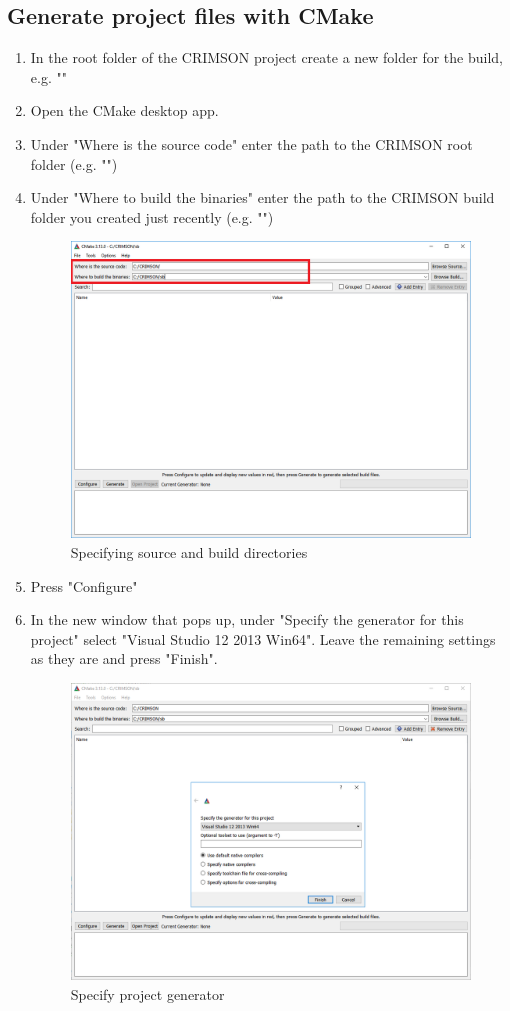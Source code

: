 \documentclass[]{scrartcl}
\begin{document}
\subsection{Generate project files with CMake}
\begin{enumerate}
	\item In the root folder of the CRIMSON project create a new folder for the build, e.g. ""
	\item Open the CMake desktop app.
	\item Under "Where is the source code" enter the path to the CRIMSON root folder (e.g. "")
	\item Under "Where to build the binaries" enter the path to the CRIMSON build folder you created just recently (e.g. "")
	
	\begin{figure}[H]
		\centering
		\includegraphics[width=0.8\linewidth]{Images/folders}
		\caption{Specifying source and build directories}
		\label{fig:folders}
	\end{figure}

	\item Press "Configure"
	\item In the new window that pops up, under "Specify the generator for this project" select "Visual Studio 12 2013 Win64". Leave the remaining settings as they are and press "Finish".
	
	\begin{figure}[H]
		\centering
		\includegraphics[width=0.8\linewidth]{Images/cmake2}
		\caption{Specify project generator}
		\label{fig:cmake2}
	\end{figure}
	

\end{enumerate}
\end{document}
